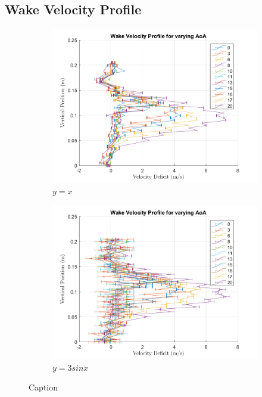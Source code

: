 \documentclass[runningheads]{llncs}
\begin{document}
\subsection{Wake Velocity Profile}
\begin{figure}
    \centering
    \begin{subfigure}[b]{0.45\textwidth}
         \centering
         \includegraphics[width=\textwidth]{figures/scanivalve_wake_velocities.png}
         \caption{$y=x$}
         \label{fig:y equals x}
     \end{subfigure}
     \begin{subfigure}[b]{0.45\textwidth}
         \centering
         \includegraphics[width=\textwidth]{figures/manometer_wake_velocities.png}
         \caption{$y=3sinx$}
         \label{fig:three sin x}
     \end{subfigure}
    \caption{Caption}
    \label{fig:wake_velocities}
\end{figure}
\end{document}
